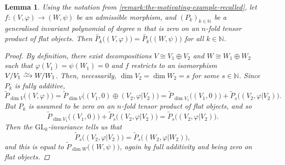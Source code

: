 \documentclass[11pt,fleqn]{article}
\theoremstyle{plain}
\newtheorem{lemma}[theorem]{Lemma}
\theoremstyle{definition}
\theoremstyle{remark}
\numberwithin{equation}{theorem}
\newcommand{\restricted}{\mathbin{\big\vert}}
\newcommand{\congto}{\xrightarrow{\raisebox{-.5ex}[0ex][0ex]{$\sim$}}}
\newcommand{\GL}{\mathrm{GL}}
\begin{document}
        \begin{lemma}\label{lemma:generalised-invariant-polynomials-are-admissible-invariant}
            Using the notation from \cref{remark:the-motivating-example-recalled}, let $f\colon(V,\varphi)\to(W,\psi)$ be an admissible morphism, and $(P_k)_{k\in\mathbb{N}}$ be a generalised invariant polynomial of degree $n$ that is zero on an $n$-fold tensor product of flat objects.
            Then $\widetilde{P_k}\big((V,\varphi)\big)=\widetilde{P_k}\big((W,\psi)\big)$ for all $k\in\mathbb{N}$.
            \begin{proof}
                By definition, there exist decompositions $V\cong V_1\oplus V_2$ and $W\cong W_1\oplus W_2$ such that $\varphi(V_1)=\psi(W_1)=0$ and $f$ restricts to an isomorphism $V/V_1\congto W/W_1$.
                Then, necessarily, $\dim V_2=\dim W_2=s$ for some $s\in\mathbb{N}$.
                Since $P_k$ is fully additive,
                \begin{equation*}
                    \widetilde{P}_{\dim V}\big((V,\varphi)\big) = \widetilde{P}_{\dim V}\big((V_1,0)\oplus(V_2,\varphi\restricted V_2)\big) = \widetilde{P}_{\dim V_1}\big((V_1,0)\big) + \widetilde{P}_{s}\big((V_2,\varphi\restricted V_2)\big).
                \end{equation*}
                But $P_k$ is assumed to be zero on an $n$-fold tensor product of flat objects, and so
                \begin{equation*}
                    \widetilde{P}_{\dim V_1}\big((V_1,0)\big) + \widetilde{P}_{s}\big((V_2,\varphi\restricted V_2)\big) = \widetilde{P}_{s}\big((V_2,\varphi\restricted V_2)\big).
                \end{equation*}
                Then the $\GL_k$-invariance tells us that
                \begin{equation*}
                    \widetilde{P}_{s}\big((V_2,\varphi\restricted V_2)\big) = \widetilde{P}_{s}\big((W_2,\varphi\restricted W_2)\big),
                \end{equation*}
                and this is equal to $\widetilde{P}_{\dim W}\big((W,\psi)\big)$, again by full additivity and being zero on flat objects.
            \end{proof}
        \end{lemma}
\end{document}
